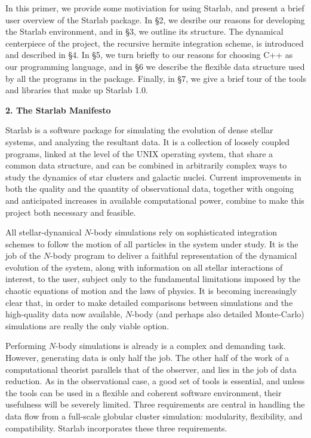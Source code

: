 In this primer, we provide some motiviation for using Starlab, and
present a brief user overview of the Starlab package.  In \S2, we
desribe our reasons for developing the Starlab environment, and in
\S3, we outline its structure.  The dynamical centerpiece of the
project, the recursive hermite integration scheme, is introduced and
described in \S4.  In \S5, we turn briefly to our reasons for choosing
C++ as our programming language, and in \S6 we describe the flexible
data structure used by all the programs in the package.  Finally, in
\S7, we give a brief tour of the tools and libraries that make up
Starlab 1.0.

\null\bigskip
\centerline{\bf 2. The Starlab Manifesto}
\medskip

Starlab is a software package for simulating the evolution of dense
stellar systems, and analyzing the resultant data.  It is a collection
of loosely coupled programs, linked at the level of the UNIX operating
system, that share a common data structure, and can be combined in
arbitrarily complex ways to study the dynamics of star clusters and
galactic nuclei.  Current improvements in both the quality and the
quantity of observational data, together with ongoing and anticipated
increases in available computational power, combine to make this
project both necessary and feasible.

All stellar-dynamical $N$-body simulations rely on sophisticated
integration schemes to follow the motion of all particles in the
system under study.  It is the job of the $N$-body program to deliver
a faithful representation of the dynamical evolution of the system,
along with information on all stellar interactions of interest, to the
user, subject only to the fundamental limitations imposed by the
chaotic equations of motion and the laws of physics.  It is becoming
increasingly clear that, in order to make detailed comparisons between
simulations and the high-quality data now available, $N$-body (and
perhaps also detailed Monte-Carlo) simulations are really the only
viable option.

Performing $N$-body simulations is already is a complex and demanding
task.  However, generating data is only half the job.  The other half
of the work of a computational theorist parallels that of the
observer, and lies in the job of data reduction.  As in the
observational case, a good set of tools is essential, and unless the
tools can be used in a flexible and coherent software environment,
their usefulness will be severely limited.  Three requirements are
central in handling the data flow from a full-scale globular cluster
simulation: modularity, flexibility, and compatibility.  Starlab
incorporates these three requirements.

